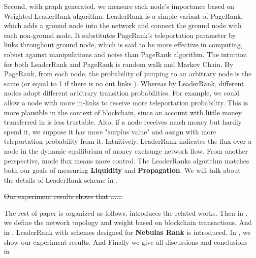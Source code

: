 Second, with graph generated, we measure each node's importance based on Weighted LeaderRank algorithm\cite{Chen2013}\cite{Li2014}. LeaderRank is a simple variant of PageRank, which adds a ground node into the network and connect the ground node with each non-ground node. It substitutes PageRank's teleportation parameter by links throughout ground node, which is said to be more effective in computing, robust against manipulations and noise than PageRank algorithm\cite{Chen2013}. The intuition for both LeaderRank and PageRank is random walk and Markov Chain. By PageRank, from each node, the probability of jumping to an arbitrary node is the same (or equal to 1 if there is no out links \cite{Kim2002}). Whereas by LeaderRank\cite{Li2014}\cite{Chen2013}, different nodes adopt different arbitrary transition probabilities. For example, we could allow a node with more in-links to receive more teleportation probability. This is more plausible in the context of blockchain, since an account with little money transferred in is less trustable. Also, if a node receives much money but hardly spend it, we suppose it has more "surplus value" and assign with more teleportation probability from it. Intuitively, LeaderRank indicates the flux over a node in the dynamic equilibrium of money exchange network flow. From another perspective, mode flux means more control. The LeaderRanks algorithm matches both our goals of measuring \textbf{Liquidity} and \textbf{Propagation}. We will talk about the details of LeaderRank scheme in .

\st{Our experiment results shows that ...... }

The rest of paper is organized as follows.  introduces the related works. Then in , we define the network topology and weight based on blockchain transactions. And in , LeaderRank with schemes designed for \textbf{Nebulas Rank} is introduced. In , we show our experiment results. And Finally we give all discussions and conclusions in 

